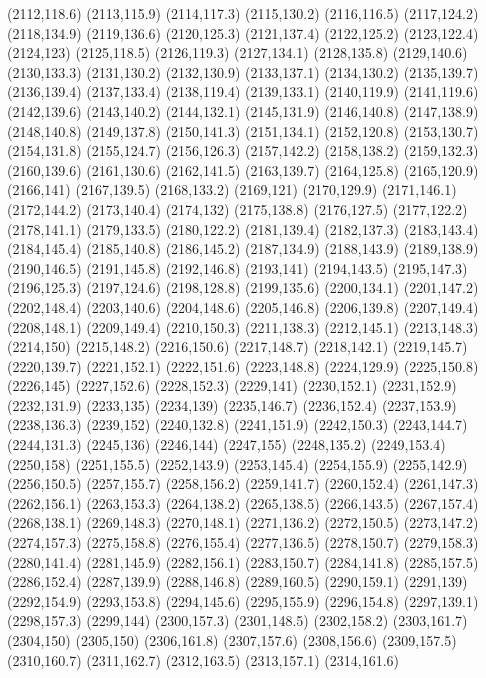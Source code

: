 (2112,118.6)
(2113,115.9)
(2114,117.3)
(2115,130.2)
(2116,116.5)
(2117,124.2)
(2118,134.9)
(2119,136.6)
(2120,125.3)
(2121,137.4)
(2122,125.2)
(2123,122.4)
(2124,123)
(2125,118.5)
(2126,119.3)
(2127,134.1)
(2128,135.8)
(2129,140.6)
(2130,133.3)
(2131,130.2)
(2132,130.9)
(2133,137.1)
(2134,130.2)
(2135,139.7)
(2136,139.4)
(2137,133.4)
(2138,119.4)
(2139,133.1)
(2140,119.9)
(2141,119.6)
(2142,139.6)
(2143,140.2)
(2144,132.1)
(2145,131.9)
(2146,140.8)
(2147,138.9)
(2148,140.8)
(2149,137.8)
(2150,141.3)
(2151,134.1)
(2152,120.8)
(2153,130.7)
(2154,131.8)
(2155,124.7)
(2156,126.3)
(2157,142.2)
(2158,138.2)
(2159,132.3)
(2160,139.6)
(2161,130.6)
(2162,141.5)
(2163,139.7)
(2164,125.8)
(2165,120.9)
(2166,141)
(2167,139.5)
(2168,133.2)
(2169,121)
(2170,129.9)
(2171,146.1)
(2172,144.2)
(2173,140.4)
(2174,132)
(2175,138.8)
(2176,127.5)
(2177,122.2)
(2178,141.1)
(2179,133.5)
(2180,122.2)
(2181,139.4)
(2182,137.3)
(2183,143.4)
(2184,145.4)
(2185,140.8)
(2186,145.2)
(2187,134.9)
(2188,143.9)
(2189,138.9)
(2190,146.5)
(2191,145.8)
(2192,146.8)
(2193,141)
(2194,143.5)
(2195,147.3)
(2196,125.3)
(2197,124.6)
(2198,128.8)
(2199,135.6)
(2200,134.1)
(2201,147.2)
(2202,148.4)
(2203,140.6)
(2204,148.6)
(2205,146.8)
(2206,139.8)
(2207,149.4)
(2208,148.1)
(2209,149.4)
(2210,150.3)
(2211,138.3)
(2212,145.1)
(2213,148.3)
(2214,150)
(2215,148.2)
(2216,150.6)
(2217,148.7)
(2218,142.1)
(2219,145.7)
(2220,139.7)
(2221,152.1)
(2222,151.6)
(2223,148.8)
(2224,129.9)
(2225,150.8)
(2226,145)
(2227,152.6)
(2228,152.3)
(2229,141)
(2230,152.1)
(2231,152.9)
(2232,131.9)
(2233,135)
(2234,139)
(2235,146.7)
(2236,152.4)
(2237,153.9)
(2238,136.3)
(2239,152)
(2240,132.8)
(2241,151.9)
(2242,150.3)
(2243,144.7)
(2244,131.3)
(2245,136)
(2246,144)
(2247,155)
(2248,135.2)
(2249,153.4)
(2250,158)
(2251,155.5)
(2252,143.9)
(2253,145.4)
(2254,155.9)
(2255,142.9)
(2256,150.5)
(2257,155.7)
(2258,156.2)
(2259,141.7)
(2260,152.4)
(2261,147.3)
(2262,156.1)
(2263,153.3)
(2264,138.2)
(2265,138.5)
(2266,143.5)
(2267,157.4)
(2268,138.1)
(2269,148.3)
(2270,148.1)
(2271,136.2)
(2272,150.5)
(2273,147.2)
(2274,157.3)
(2275,158.8)
(2276,155.4)
(2277,136.5)
(2278,150.7)
(2279,158.3)
(2280,141.4)
(2281,145.9)
(2282,156.1)
(2283,150.7)
(2284,141.8)
(2285,157.5)
(2286,152.4)
(2287,139.9)
(2288,146.8)
(2289,160.5)
(2290,159.1)
(2291,139)
(2292,154.9)
(2293,153.8)
(2294,145.6)
(2295,155.9)
(2296,154.8)
(2297,139.1)
(2298,157.3)
(2299,144)
(2300,157.3)
(2301,148.5)
(2302,158.2)
(2303,161.7)
(2304,150)
(2305,150)
(2306,161.8)
(2307,157.6)
(2308,156.6)
(2309,157.5)
(2310,160.7)
(2311,162.7)
(2312,163.5)
(2313,157.1)
(2314,161.6)
